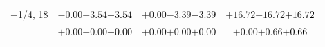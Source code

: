 \documentclass[compress]{beamer}
\begin{document}
\begin{frame}
\begin{tabular}{r | c | c | c}
$-$1/4, 18 & $-0.00$\hspace{0.1 cm}$-3.54$\hspace{0.1 cm}\textcolor{black}{$-3.54$} & $+0.00$\hspace{0.1 cm}$-3.39$\hspace{0.1 cm}\textcolor{black}{$-3.39$} & $+16.72$\hspace{0.1 cm}$+16.72$\hspace{0.1 cm}\textcolor{black}{$+16.72$} \\
           & $+0.00$\hspace{0.1 cm}$+0.00$\hspace{0.1 cm}\textcolor{black}{$+0.00$} & $+0.00$\hspace{0.1 cm}$+0.00$\hspace{0.1 cm}\textcolor{black}{$+0.00$} & $+0.00$\hspace{0.1 cm}$+0.66$\hspace{0.1 cm}\textcolor{black}{$+0.66$} \\
\end{tabular}
\end{frame}
\end{document}
